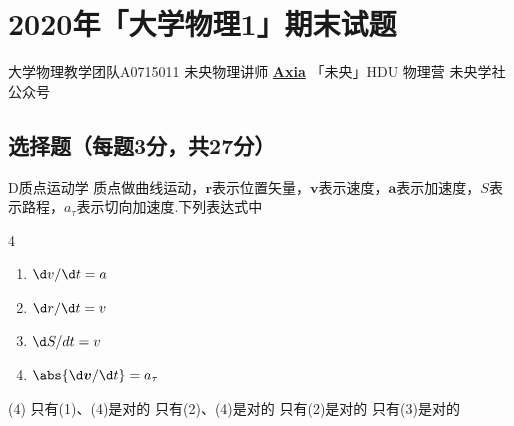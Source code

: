 \chapter{2020年「大学物理1」\hdu 期末试题}
\date{2020年6月??日}{大学物理教学团队}{A0715011}
{未央物理讲师 \href{https://qm.qq.com/q/UPbGudx8cK}{\textbf{Axia}}}
{}{「未央」HDU 物理营}
{}{未央学社公众号}
\section{选择题（每题3分，共27分）}
{
    \begin{choice}{D}{质点运动学}
        质点做曲线运动，$\boldsymbol{r}$表示位置矢量，$\boldsymbol{v}$表示速度，$\boldsymbol{a}$表示加速度，$S$表示路程，$a_{\tau}$表示切向加速度.下列表达式中
        \begin{multicols}{4}
            \begin{enumerate}[label=(\arabic*)]
                \item $\d v/\d t=a$
                \item $\d r/\d t=v$
                \item $\d S/dt=v$
                \item $\abs{\d\boldsymbol{v}/\d t}=a_{\tau}$
            \end{enumerate}
        \end{multicols}
        \begin{tasks}(4)
            \task 只有(1)、(4)是对的
            \task 只有(2)、(4)是对的
            \task 只有(2)是对的
            \task 只有(3)是对的
        \end{tasks}
    \end{choice}
}
